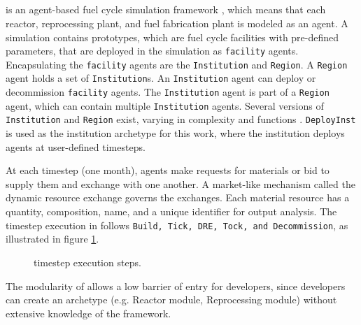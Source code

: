 \subsection{\Cyclus}

\Cyclus is an agent-based fuel cycle simulation framework 
\cite{huff_fundamental_2016}, which means 
that each reactor, reprocessing plant, and fuel fabrication plant is modeled as an agent.
A \Cyclus simulation contains prototypes, which are fuel cycle facilities with
pre-defined parameters, that are deployed in the simulation as \texttt{facility} agents.
Encapsulating the \texttt{facility} agents are the \texttt{Institution} and \texttt{Region}.
A \texttt{Region} agent holds a set of \texttt{Institution}s.
An \texttt{Institution} agent can deploy or decommission \texttt{facility} agents.
The \texttt{Institution} agent is part of a \texttt{Region} agent,
which can contain multiple \texttt{Institution} agents. Several versions of \texttt{Institution}
and \texttt{Region} exist, varying in complexity and functions \cite{huff_extensions_2014}.
 \texttt{DeployInst} is used as the institution archetype for this work, where the institution
deploys agents at user-defined timesteps.

At each timestep (one month),
agents make requests for materials or bid to supply them and exchange
with one another. A market-like mechanism called the dynamic resource exchange
\cite{gidden_agent-based_2015} governs the exchanges.
Each material resource has a quantity, composition, name, and a unique identifier
for output analysis. The timestep execution in \Cyclus follows 
\texttt{Build, Tick, \gls{DRE}, Tock, and Decommission}, as illustrated in
figure \ref{fig:time}.

\begin{figure}[h]
\centering
{}
\caption{\Cyclus timestep execution steps.}
\label{fig:time}
\end{figure}

The modularity of \Cyclus allows a low barrier of
entry for developers, since developers can create an
archetype (e.g. Reactor module, Reprocessing module)
without extensive knowledge of the \Cyclus framework.
